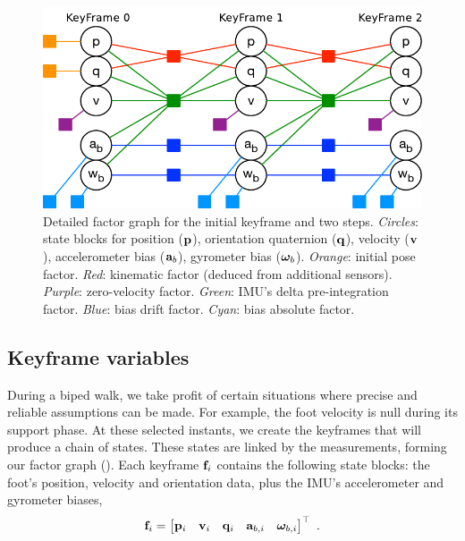 \begin{figure}[tb]
\centering
\includegraphics[scale=0.65]{figures/graph_exploded}
\caption{
Detailed factor graph for the initial keyframe and two steps. 
\emph{Circles}: state blocks for position (${\bf p}$), orientation quaternion (${\bf q}$), velocity (${\bf v}$), accelerometer bias (${\bf a}_b$), gyrometer bias (${{\bm \omega}}_b$). 
\emph{Orange}: initial pose factor. 
\emph{Red}: kinematic factor (deduced from additional sensors). 
\emph{Purple}: zero-velocity factor. 
\emph{Green}: IMU's delta pre-integration factor. 
\emph{Blue}: bias drift factor. 
\emph{Cyan}: bias absolute factor. 
}
\label{fig:factor_graph}
\end{figure}




\subsection{Keyframe variables}

During a biped walk, we take profit of certain situations where precise and reliable assumptions can be made. For example, the  foot velocity is null during its support phase. At these selected instants, we create the keyframes that will produce a chain of states. These states are linked by the measurements, forming our factor graph (). Each keyframe ${\bf f}_i$ contains the following state blocks: the foot's position, velocity and orientation data, plus the IMU's accelerometer and gyrometer biases,
%
\begin{align}
{\bf f}_i = \begin{bmatrix}
{\bf p}_i & {\bf v}_i & {\bf q}_i & {\bf a}_{b,i} & {{\bm \omega}}_{b,i}
\end{bmatrix}^{\top}
~.
\end{align}
%


